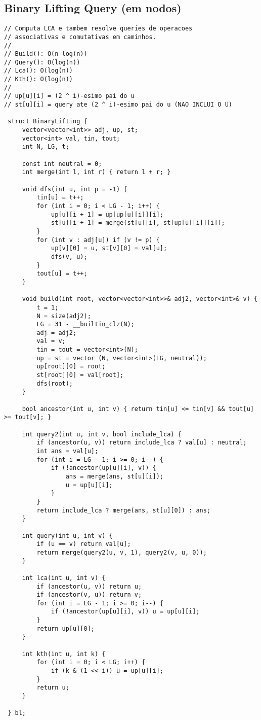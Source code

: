 \documentclass[11pt, a4paper, twoside]{article}
\begin{document}
\subsection{Binary Lifting Query (em nodos)}
\begin{lstlisting}
// Computa LCA e tambem resolve queries de operacoes
// associativas e comutativas em caminhos.
//
// Build(): O(n log(n))
// Query(): O(log(n))
// Lca(): O(log(n))
// Kth(): O(log(n))
//
// up[u][i] = (2 ^ i)-esimo pai do u
// st[u][i] = query ate (2 ^ i)-esimo pai do u (NAO INCLUI O U)

 struct BinaryLifting {
     vector<vector<int>> adj, up, st;
     vector<int> val, tin, tout;
     int N, LG, t;
 
     const int neutral = 0;
     int merge(int l, int r) { return l + r; }
 
     void dfs(int u, int p = -1) {
         tin[u] = t++;
         for (int i = 0; i < LG - 1; i++) {
             up[u][i + 1] = up[up[u][i]][i];
             st[u][i + 1] = merge(st[u][i], st[up[u][i]][i]);
         }
         for (int v : adj[u]) if (v != p) {
             up[v][0] = u, st[v][0] = val[u];
             dfs(v, u);
         }
         tout[u] = t++;
     }
 
     void build(int root, vector<vector<int>>& adj2, vector<int>& v) {
         t = 1;
         N = size(adj2);
         LG = 31 - __builtin_clz(N);
         adj = adj2;
         val = v;
         tin = tout = vector<int>(N);
         up = st = vector (N, vector<int>(LG, neutral));
         up[root][0] = root;
         st[root][0] = val[root];
         dfs(root);
     }
 
     bool ancestor(int u, int v) { return tin[u] <= tin[v] && tout[u] >= tout[v]; }
 
     int query2(int u, int v, bool include_lca) {
         if (ancestor(u, v)) return include_lca ? val[u] : neutral;
         int ans = val[u];
         for (int i = LG - 1; i >= 0; i--) {
             if (!ancestor(up[u][i], v)) {
                 ans = merge(ans, st[u][i]);
                 u = up[u][i];
             }
         }
         return include_lca ? merge(ans, st[u][0]) : ans;
     }
 
     int query(int u, int v) {
         if (u == v) return val[u];
         return merge(query2(u, v, 1), query2(v, u, 0));
     }
 
     int lca(int u, int v) {
         if (ancestor(u, v)) return u;
         if (ancestor(v, u)) return v;
         for (int i = LG - 1; i >= 0; i--) {
             if (!ancestor(up[u][i], v)) u = up[u][i];
         }
         return up[u][0];
     }
 
     int kth(int u, int k) {
         for (int i = 0; i < LG; i++) {
             if (k & (1 << i)) u = up[u][i];
         }
         return u;
     }
 
 } bl;
\end{lstlisting}
\end{document}
